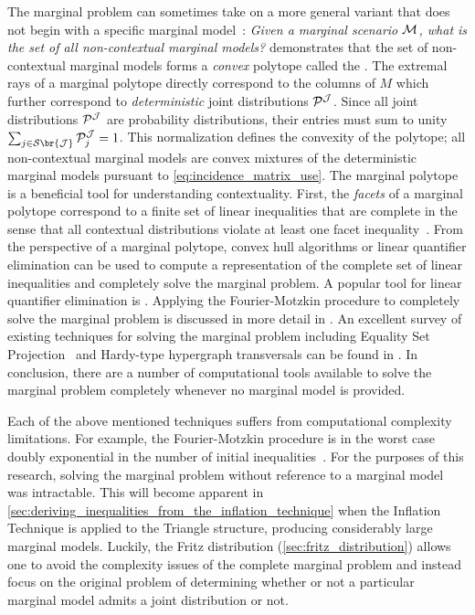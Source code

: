 \documentclass[aps, 10pt, english, twoside, pra, nofootinbib, tightenlines, longbibliography, superscriptaddress]{revtex4-1}
\renewcommand{\Events}[1]{\mathcal{S}\br{#1}} %
\begin{document}
    The marginal problem can sometimes take on a more general variant that does not begin with a specific marginal model~\cite{Abramsky_2012,Mansfield_2012,Fritz_2011}: \textit{Given a marginal scenario $\mathcal{M}$, what is the set of all non-contextual marginal models?} \citet{Pitowsky_1991} demonstrates that the set of non-contextual marginal models forms a \textit{convex} polytope called the . The extremal rays of a marginal polytope directly correspond to the columns of $M$ which further correspond to \textit{deterministic} joint distributions $\probvec^{\jointvar}$. Since all joint distributions $\probvec^{\jointvar}$ are probability distributions, their entries must sum to unity $\sum_{j \in \Events{\jointvar}} \probvec^{\jointvar}_j = 1$. This normalization defines the convexity of the polytope; all non-contextual marginal models are convex mixtures of the deterministic marginal models pursuant to \cref{eq:incidence_matrix_use}. The marginal polytope is a beneficial tool for understanding contextuality. First, the \textit{facets} of a marginal polytope correspond to a finite set of linear inequalities that are complete in the sense that all contextual distributions violate at least one facet inequality~\cite{Brunner_2013}. From the perspective of a marginal polytope, convex hull algorithms or linear quantifier elimination can be used to compute a representation of the complete set of linear inequalities and completely solve the marginal problem. A popular tool for linear quantifier elimination is  \cite{Dantzig_1973,Inflation,Abramsky_2012,jones_2004}. Applying the Fourier-Motzkin procedure to completely solve the marginal problem is discussed in more detail in \citet{Fritz_2011}. An excellent survey of existing techniques for solving the marginal problem including Equality Set Projection~\cite{jones_2004} and Hardy-type hypergraph transversals can be found in \citet{Inflation}. In conclusion, there are a number of computational tools available to solve the marginal problem completely whenever no marginal model is provided.

    Each of the above mentioned techniques suffers from computational complexity limitations. For example, the Fourier-Motzkin procedure is in the worst case doubly exponential in the number of initial inequalities~\cite{Dantzig_1973}. For the purposes of this research, solving the marginal problem without reference to a marginal model was intractable. This will become apparent in \cref{sec:deriving_inequalities_from_the_inflation_technique} when the Inflation Technique is applied to the Triangle structure, producing considerably large marginal models. Luckily, the Fritz distribution (\cref{sec:fritz_distribution}) allows one to avoid the complexity issues of the complete marginal problem and instead focus on the original problem of determining whether or not a particular marginal model admits a joint distribution or not.
\end{document}
